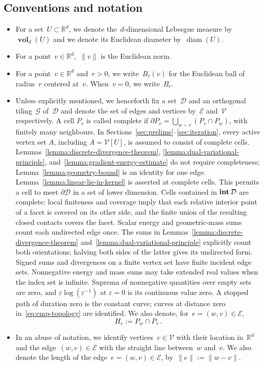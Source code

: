 \documentclass[12pt]{amsart}
\numberwithin{equation}{section}
\DeclareMathOperator{\diam}{{\mathop{diam}}}
\DeclareMathOperator{\intr}{\mathop{\bf int}}
\newcommand*{\Rd}{\ensuremath{\mathbb{R}^d}}
\newcommand{\G}{\mathcal{G}}
\newcommand{\V}{\mathcal{V}}
\newcommand{\E}{\mathcal{E}}
\newcommand{\eps}{\varepsilon}
\DeclareMathOperator{\vol}{\mathbf{vol}}
\begin{document}
\subsection*{Conventions and notation}
\begin{itemize}
	\item For a set~$U \subset \Rd$, we denote the~$d$-dimensional Lebesgue measure by $\vol_{d}(U)$
	and we denote its Euclidean diameter by~$\diam(U)$.
	\item For a point~$v \in \Rd$,~$\|v\|$ is the Euclidean norm.
	\item For a point~$v \in \Rd$ and~$r > 0$, we write~$B_r(v)$ for the Euclidean ball of radius~$r$ centered at~$v$. When~$v=0$, we write~$B_r$. 
	\item Unless explicitly mentioned, we henceforth fix a set~$\mathcal{D}$ and an orthogonal tiling~$\G$ of~$\mathcal{D}$ and denote the set of edges and vertices by~$\E$ and~$\V$ respectively.
        A cell $P_v$ is called complete if
        $\partial P_v=\bigcup_{w\sim v}(P_v\cap P_w)$, with finitely many neighbours.
        In Sections~\ref{sec:prelims}--\ref{sec:iteration}, every active vertex set $A$, including $A=\V[U]$, is assumed to consist of complete cells. Lemmas~\ref{lemma:discrete-divergence-theorem}, \ref{lemma:dual-variational-principle}, and~\ref{lemma:gradient-energy-estimate} do not require completeness; Lemma~\ref{lemma:geometry-bound} is an identity for one edge. Lemma~\ref{lemma:linear-lie-in-kernel} is asserted at complete cells. This permits a cell to meet $\partial\mathcal D$ in a set of lower dimension. Cells contained in $\intr\mathcal D$ are complete: local finiteness and coverage imply that each relative interior point of a facet is covered on its other side, and the finite union of the resulting closed contacts covers the facet.
        Scalar energy and geometric-mass sums count each undirected edge once. The sums in Lemmas~\ref{lemma:discrete-divergence-theorem} and~\ref{lemma:dual-variational-principle} explicitly count both orientations; halving both sides of the latter gives its undirected form.
        Signed sums and divergences on a finite vertex set have finite incident edge sets. Nonnegative energy and mass sums may take extended real values when the index set is infinite. Suprema of nonnegative quantities over empty sets are zero, and $\eps\log(\eps^{-1})$ at $\eps=0$ is its continuous value zero.
        A stopped path of duration zero is the constant curve; curves at distance zero in~\eqref{eq:cmp-topology} are identified. 
	We also denote, for~$e = (w,v) \in \E$, 
	\[
	H_e := P_w \cap P_v \, . 
	\]
	\item In an abuse of notation, we identify vertices~$v \in \V$
	with their location in~$\Rd$ and the edge~$(w,v) \in \E$ with 
	the straight line between~$w$ and~$v$. We also denote the length of the edge~$e = (w,v) \in \E$, by~$\|e\| := \|w - v\|$. 
	

\end{itemize}
\end{document}
